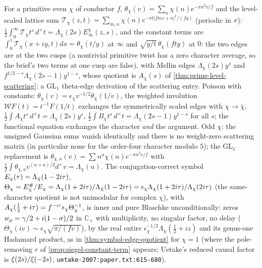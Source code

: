\begin{theorem}
\label{thm:twisted-theta-edges}
For a primitive even $\chi$ of conductor $f$, $\theta_\chi(v) = \sum_n\chi(n)e^{-\pi n^2v/f}$ and the level-scaled lattice sum
$\mathcal T_\chi(z,t) = \sum_{m,n}\chi(n)e^{-\pi t|fmz+n|^2/(fy)}$ (periodic in $x$): $\tfrac12\int_0^\infty\mathcal T_\chi t^s\,d^\times t
= \Lambda_\chi(2s)E^{\bar\chi}_\infty(z,s)$, and the constant terms are $\int_0^1\mathcal T_\chi(x+iy,t)dx = \theta_\chi(t/y)$ at $\infty$
and $\sqrt{y/t}\,\theta_\chi(fty)$ at $0$: the two edges are at the two cusps (a nontrivial primitive twist has a zero
character average, so the brief's two terms at one cusp are false), with Mellin edges $\Lambda_\chi(2s)y^s$ and
$f^{1/2-s}\Lambda_\chi(2s-1)y^{1-s}$, whose quotient is $A_\chi(s)$ of \cref{thm:prime-level-scattering}: a GL$_1$ theta-edge
derivation of the scattering entry. Poisson with constants: $\theta_\chi(v) = \epsilon_\chi v^{-1/2}\theta_{\bar\chi}(1/v)$,
the weighted involution $\mathcal WF(t) = t^{-1}F(1/t)$ exchanges the symmetrically scaled edges with $\chi\to\bar\chi$,
$\tfrac12\int A_\chi t^s\,d^\times t = \Lambda_\chi(2s)y^s$, $\tfrac12\int B_\chi t^s\,d^\times t = \Lambda_\chi(2s-1)y^{1-s}$ for all
$s$; the functional equation exchanges the character \emph{and} the argument. Odd $\chi$: the unsigned Gaussian sums vanish
identically and there is no weight-zero scattering matrix (in particular none for the order-four character modulo $5$); the
GL$_1$ replacement is $\theta_{\chi,a}(v) = \sum n^a\chi(n)e^{-\pi n^2v/f}$ with $\tfrac12\int\theta_{\chi,a}v^{(u+a)/2}d^\times v =
\Lambda_\chi(u)$. The conjugation-correct symbol $E_\chi(\tau) = \Lambda_{\bar\chi}(1-2i\tau)$,
$\Theta_\chi = E_\chi^\#/E_\chi = \Lambda_\chi(1+2i\tau)/\Lambda_{\bar\chi}(1-2i\tau) = \epsilon_\chi\Lambda_\chi(1+2i\tau)/\Lambda_\chi(2i\tau)$
(the same-character quotient is not unimodular for complex $\chi$), with $A_\chi(\tfrac12+i\tau) = f^{-i\tau}\epsilon_\chi\Theta_\chi^{-1}$,
is inner and pure Blaschke unconditionally: zeros $w_\rho = \gamma/2+i(1-\sigma)/2$ in $\mathbb C_+$ with multiplicity, no
singular factor, no delay ($\Theta_\chi(iv)\sim\epsilon_\chi\sqrt{\pi/(fv)}$), by the real entire $\epsilon_\chi^{-1/2}\Lambda_\chi(\tfrac12+iz)$
and its genus-one Hadamard product, as in \cref{thm:symbol-edge-quotient} for $\chi = 1$ (where the pole-removing $r$ of
\cref{prop:siegel-constant-term} appears; Uetake's reduced causal factor is $\xi(2s)/\xi(-2s)$,
\texttt{uetake-2007:paper.txt:615-680}).
\end{theorem}


